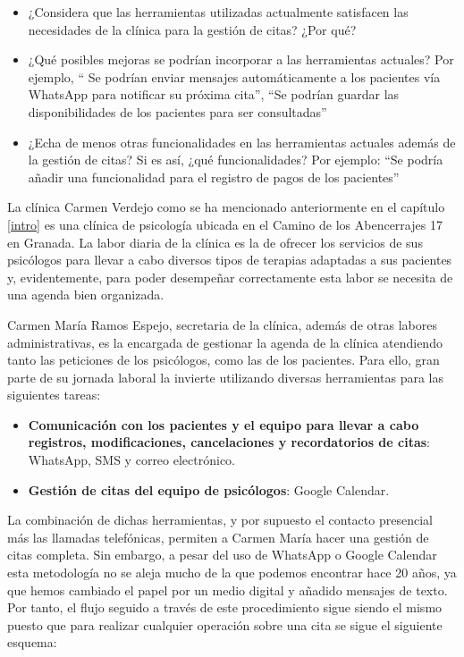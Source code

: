 \begin{itemize}
    \item ¿Considera que las herramientas utilizadas actualmente satisfacen las necesidades de la clínica para la gestión de citas? ¿Por qué?
    \item¿Qué posibles mejoras se podrían incorporar a las herramientas actuales? Por ejemplo, “ Se podrían enviar mensajes automáticamente a los pacientes vía WhatsApp para notificar su próxima cita”, “Se podrían guardar las disponibilidades de los pacientes para ser consultadas”
    \item¿Echa de menos otras funcionalidades en las herramientas actuales además de la gestión de citas? Si es así, ¿qué funcionalidades? Por ejemplo: “Se podría añadir una funcionalidad para el registro de pagos de los pacientes”
\end{itemize}

La clínica Carmen Verdejo como se ha mencionado anteriormente en el capítulo \ref{intro} es una clínica de psicología ubicada en el Camino de los Abencerrajes 17 en Granada. La labor diaria de la clínica es la de ofrecer los servicios de sus psicólogos para llevar a cabo diversos tipos de terapias adaptadas a sus pacientes y, evidentemente, para poder desempeñar correctamente esta labor se necesita de una agenda bien organizada.\bigskip

Carmen María Ramos Espejo, secretaria de la clínica, además de otras labores administrativas, es la encargada de gestionar la agenda de la clínica atendiendo tanto las peticiones de los psicólogos, como las de los pacientes. Para ello, gran parte de su jornada laboral la invierte utilizando diversas herramientas para las siguientes tareas:

\begin{itemize}
    \item \textbf{Comunicación con los pacientes y el equipo para llevar a cabo registros, modificaciones, cancelaciones y recordatorios de citas}: WhatsApp, SMS y correo electrónico.
    \item \textbf{Gestión de citas del equipo de psicólogos}: Google Calendar.
\end{itemize}

La combinación de dichas herramientas, y por supuesto el contacto presencial más las llamadas telefónicas, permiten a Carmen María hacer una gestión de citas completa. Sin embargo, a pesar del uso de WhatsApp o Google Calendar esta metodología no se aleja mucho de la que podemos encontrar hace 20 años, ya que hemos cambiado el papel por un medio digital y añadido mensajes de texto. Por tanto, el flujo seguido a través de este procedimiento sigue siendo el mismo puesto que para realizar cualquier operación sobre una cita se sigue el siguiente esquema:

